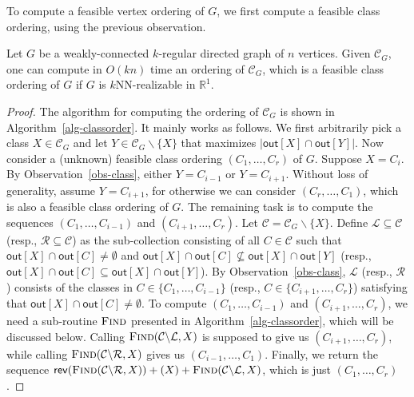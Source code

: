 \documentclass[english]{lipics-v2021}
\begin{document}
To compute a feasible vertex ordering of $G$, we first compute a feasible class ordering, using the previous observation.
\begin{lemma} \label{lem-classorder}
    Let $G$ be a weakly-connected $k$-regular directed graph of $n$ vertices.
    Given $\mathcal{C}_G$, one can compute in $O(kn)$ time an ordering of $\mathcal{C}_G$, which is a feasible class ordering of $G$ if $G$ is $k$NN-realizable in $\mathbb{R}^1$.
\end{lemma}

\begin{proof}
The algorithm for computing the ordering of $\mathcal{C}_G$ is shown in Algorithm~\ref{alg-classorder}.
It mainly works as follows.
We first arbitrarily pick a class $X \in \mathcal{C}_G$ and let $Y \in \mathcal{C}_G \backslash \{X\}$ that maximizes $|\mathsf{out}[X] \cap \mathsf{out}[Y]|$.
Now consider a (unknown) feasible class ordering $(C_1,\dots,C_r)$ of $G$.
Suppose $X = C_i$.
By Observation~\ref{obs-class}, either $Y = C_{i-1}$ or $Y = C_{i+1}$.
Without loss of generality, assume $Y = C_{i+1}$, for otherwise we can consider $(C_r,\dots,C_1)$, which is also a feasible class ordering of $G$.
The remaining task is to compute the sequences $(C_1,\dots,C_{i-1})$ and $(C_{i+1},\dots,C_r)$.
Let $\mathcal{C} = \mathcal{C}_G \backslash \{X\}$.
Define $\mathcal{L} \subseteq \mathcal{C}$ (resp., $\mathcal{R} \subseteq \mathcal{C}$) as the sub-collection consisting of all $C \in \mathcal{C}$ such that $\mathsf{out}[X] \cap \mathsf{out}[C] \neq \emptyset$ and $\mathsf{out}[X] \cap \mathsf{out}[C] \nsubseteq \mathsf{out}[X] \cap \mathsf{out}[Y]$ (resp., $\mathsf{out}[X] \cap \mathsf{out}[C] \subseteq \mathsf{out}[X] \cap \mathsf{out}[Y]$).
By Observation~\ref{obs-class}, $\mathcal{L}$ (resp., $\mathcal{R}$) consists of the classes in $C \in \{C_1,\dots,C_{i-1}\}$ (resp., $C \in \{C_{i+1},\dots,C_r\}$) satisfying that $\mathsf{out}[X] \cap \mathsf{out}[C] \neq \emptyset$.
To compute $(C_1,\dots,C_{i-1})$ and $(C_{i+1},\dots,C_r)$, we need a sub-routine $\textsc{Find}$ presented in Algorithm~\ref{alg-classorder}, which will be discussed below.
Calling $\textsc{Find}(\mathcal{C} \backslash \mathcal{L},X)$ is supposed to give us $(C_{i+1},\dots,C_r)$, while calling $\textsc{Find}(\mathcal{C} \backslash \mathcal{R},X)$ gives us $(C_{i-1},\dots,C_1)$.
Finally, we return the sequence $\mathsf{rev}(\textsc{Find}(\mathcal{C} \backslash \mathcal{R},X)) + (X) + \textsc{Find}(\mathcal{C} \backslash \mathcal{L},X)$, which is just $(C_1,\dots,C_r)$.

\end{proof}
\end{document}
